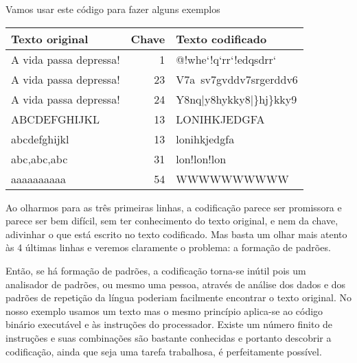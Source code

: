 Vamos usar este código para fazer alguns exemplos


\begin{tabular}{|l|r|l|}
\hline
Texto original&Chave&Texto codificado\\
\hline
A vida passa depressa!&1&@!whe`!q`rr`!edqsdrr` \\
\hline
A vida passa depressa!&23&V7a~sv7gvddv7srgerddv6\\
\hline
A vida passa depressa!&24&Y8nq|y8hykky8|\}hj\}kky9\\
\hline
ABCDEFGHIJKL&13&LONIHKJEDGFA\\
\hline
abcdefghijkl&13&lonihkjedgfa\\
\hline
abc,abc,abc&31&lon!lon!lon\\
\hline
aaaaaaaaaa&54&WWWWWWWWWW\\
\hline
\end{tabular}

Ao olharmos para as três primeiras linhas, a codificação parece ser promissora e parece ser bem difícil, sem ter conhecimento do texto original, e nem da chave, adivinhar o que está escrito no texto codificado. Mas basta um olhar mais atento às 4 últimas linhas e veremos claramente o problema: a formação de padrões.

Então, se há formação de padrões, a codificação torna-se inútil pois um analisador de padrões, ou mesmo uma pessoa, através de análise dos dados e dos padrões de repetição da língua poderiam facilmente encontrar o texto original. No nosso exemplo usamos um texto mas o mesmo princípio aplica-se ao código binário executável e às instruções do processador. Existe um número finito de instruções e suas combinações são bastante conhecidas e portanto descobrir a codificação, ainda que seja uma tarefa trabalhosa, é perfeitamente possível.

